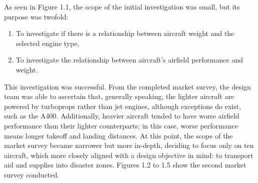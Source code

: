 \documentclass[stu, a4paper, 12pt, floatsintext]{apa7}
\numberwithin{figure}{section}
\numberwithin{table}{section}
\numberwithin{equation}{section}
\begin{document}
As seen in Figure 1.1, the scope of the initial investigation was small, but its purpose was twofold:
\begin{enumerate}
    \item To investigate if there is a relationship between aircraft weight and the selected engine type,
    \item To investigate the relationship between aircraft’s airfield performance and weight.
\end{enumerate}

This investigation was successful. From the completed market survey, the design team was able to ascertain that, generally speaking, the lighter aircraft are powered by turboprops rather than jet engines, although exceptions do exist, such as the A400. Additionally, heavier aircraft tended to have worse airfield performance than their lighter counterparts; in this case, worse performance means longer takeoff and landing distances. At this point, the scope of the market survey became narrower but more in-depth, deciding to focus only on ten aircraft, which more closely aligned with a design objective in mind: to transport aid and supplies into disaster zones. Figures 1.2 to 1.5 show the second market survey conducted. 
\end{document}
